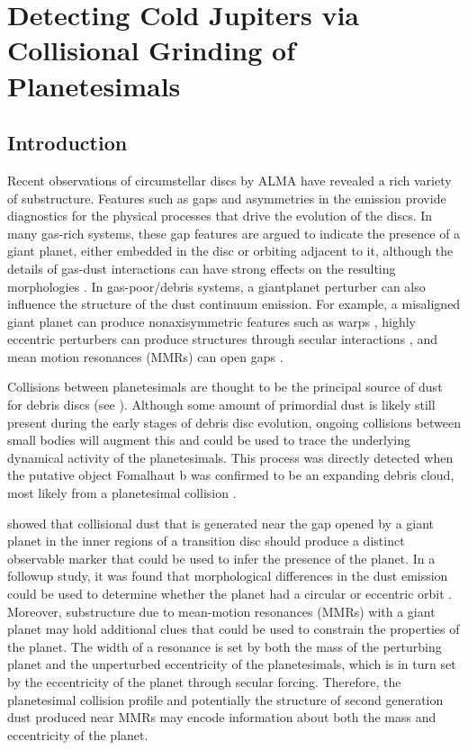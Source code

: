 \chapter {Detecting Cold Jupiters via Collisional Grinding of Planetesimals}\label{ch:grind}

\section{Introduction} \label{sec:intro}

Recent observations of circumstellar discs by ALMA have revealed a rich variety of substructure. Features such as gaps and 
asymmetries \cite{alma15, perez16, isella16, andrews16, cieza16} in the emission provide diagnostics for the physical 
processes that drive the evolution of the discs. In many gas-rich systems, these gap features are argued to indicate the 
presence of a giant planet, either embedded in the disc \cite{dipierro15} or orbiting adjacent to it, although the details of gas-dust 
interactions can have strong effects on the resulting morphologies \cite{dong18}. In gas-poor/debris systems, a giantplanet 
perturber can also influence the structure of the dust continuum emission. For example, a misaligned giant planet can produce 
nonaxisymmetric features such as warps \cite{augereau01}, highly eccentric perturbers can produce structures through secular 
interactions \cite{pearce14, pearce15}, and mean motion resonances (MMRs) can open gaps
\cite{nesvold15, tabeshian16, tabeshian18}.

Collisions between planetesimals are thought to be the principal source of dust for debris discs (see \cite{wyatt08}).  Although 
some amount of primordial dust is likely still present during the early stages of debris disc evolution, ongoing collisions between 
small bodies will augment this and could be used to trace the underlying dynamical activity of the planetesimals. This process 
was directly detected when the putative object Fomalhaut b was confirmed to be an expanding debris cloud, most likely from a 
planetesimal collision \cite{gaspar20}. 

\cite{dobinson13} showed that collisional dust that is generated near the gap opened by a giant planet in the inner regions of a 
transition disc should produce a distinct observable marker that could be used to infer the presence of the planet. In a followup 
study, it was found that morphological differences in the dust emission could be used to determine whether the planet had a 
circular or eccentric orbit \cite{dobinson16}. Moreover, substructure due to mean-motion resonances (MMRs) with a giant planet 
may hold additional clues that could be used to constrain the properties of the planet.  The width of a resonance is set by both 
the mass of the perturbing planet and the unperturbed eccentricity of the planetesimals, which is in turn set by the eccentricity of 
the planet through secular forcing. Therefore, the planetesimal collision profile and potentially the structure of second generation 
dust produced near MMRs may encode information about both the mass and eccentricity of the planet.

